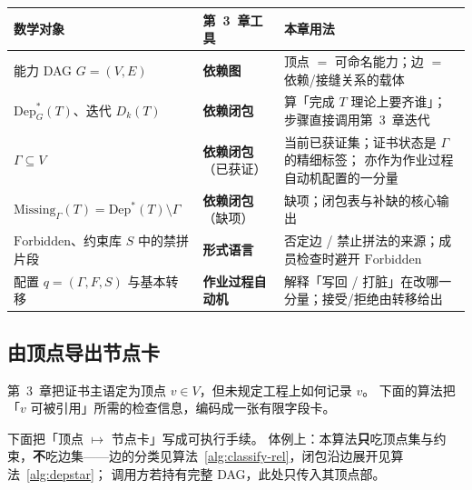 \documentclass[UTF8,a4paper,11pt]{ctexart}
\theoremstyle{definition}
\theoremstyle{plain}
\theoremstyle{remark}
\numberwithin{figure}{section}
\numberwithin{table}{section}
\begin{document}
\begin{center}
\small
\begin{tabular}{@{}L{3.6cm}L{2.8cm}L{7.0cm}@{}}
  \toprule
  数学对象 & 第~3~章工具 & 本章用法 \\
  \midrule
  能力 DAG $G=(V,E)$ &
  \textbf{依赖图} &
  顶点 $=$ 可命名能力；边 $=$ 依赖/接缝关系的载体 \\
  \midrule
  $\mathrm{Dep}^*_G(T)$、迭代 $D_k(T)$ &
  \textbf{依赖闭包} &
  算「完成 $T$ 理论上要齐谁」；步骤直接调用第~3~章迭代 \\
  \midrule
  $\Gamma\subseteq V$ &
  \textbf{依赖闭包}
  （已获证） &
  当前已获证集；证书状态是 $\Gamma$ 的精细标签；
  亦作为作业过程自动机配置的一分量 \\
  \midrule
  $\mathrm{Missing}_\Gamma(T)=\mathrm{Dep}^*(T)\setminus\Gamma$ &
  \textbf{依赖闭包}
  （缺项） &
  缺项；闭包表与补缺的核心输出 \\
  \midrule
  $\mathrm{Forbidden}$、约束库 $S$ 中的禁拼片段 &
  \textbf{形式语言} &
  否定边 / 禁止拼法的来源；成员检查时避开 $\mathrm{Forbidden}$ \\
  \midrule
  配置 $q=(\Gamma,F,S)$ 与基本转移 &
  \textbf{作业过程自动机} &
  解释「写回 / 打脏」在改哪一分量；接受/拒绝由转移给出 \\
  \bottomrule
\end{tabular}
\end{center}

\subsection{由顶点导出节点卡}
\label{sec:math-node}

第~3~章把证书主语定为顶点 $v\in V$，但未规定工程上如何记录 $v$。
下面的算法把「$v$ 可被引用」所需的检查信息，编码成一张有限字段卡。

下面把「顶点 $\mapsto$ 节点卡」写成可执行手续。
体例上：本算法\textbf{只}吃顶点集与约束，\textbf{不}吃边集——边的分类见算法~\ref{alg:classify-rel}，闭包沿边展开见算法~\ref{alg:depstar}；
调用方若持有完整 DAG，此处只传入其顶点部。
\end{document}
